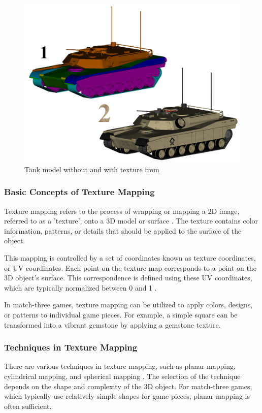 \documentclass[runningheads, 12pt]{llncs}
\begin{document}
\begin{figure}[H]
    \includegraphics[width=\textwidth]{textureMapping.png}
    \caption{Tank model without and with texture from \cite{ref_url4}} \label{fig2}
    \end{figure}

\subsubsection{Basic Concepts of Texture Mapping}
Texture mapping refers to the process of wrapping or mapping a 2D image, referred to as a 'texture', onto a 3D model or surface \cite{ref_book6}. The texture contains color information, patterns, or details that should be applied to the surface of the object.

This mapping is controlled by a set of coordinates known as texture coordinates, or UV coordinates. Each point on the texture map corresponds to a point on the 3D object's surface. This correspondence is defined using these UV coordinates, which are typically normalized between 0 and 1 \cite{ref_book7}.

In match-three games, texture mapping can be utilized to apply colors, designs, or patterns to individual game pieces. For example, a simple square can be transformed into a vibrant gemstone by applying a gemstone texture.

\subsubsection{Techniques in Texture Mapping}
There are various techniques in texture mapping, such as planar mapping, cylindrical mapping, and spherical mapping \cite{ref_book8}. The selection of the technique depends on the shape and complexity of the 3D object. For match-three games, which typically use relatively simple shapes for game pieces, planar mapping is often sufficient.
\end{document}
